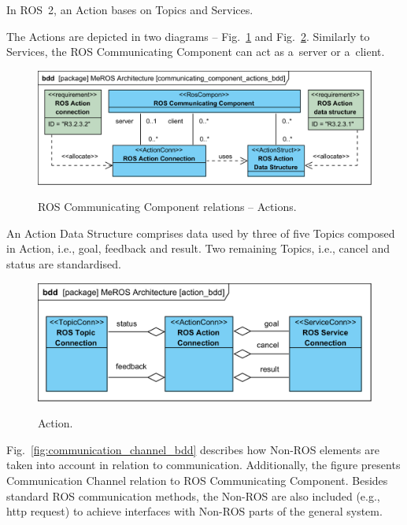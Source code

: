 \documentclass[11pt,oneside,a4paper]{report}
\begin{document}
	In ROS~2, an Action bases on Topics and Services.
	
	
	The Actions are depicted in two diagrams -- Fig.~\ref{fig:communicating_component_actions_bdd} and Fig.~\ref{fig:action_bdd}. Similarly to Services, the ROS Communicating Component can act as a~server or a~client.	 
	
	
	\begin{figure}[H]
		\centering
		\begin{center}
			{\includegraphics[scale=1.0]{diagrams/communicating_component_actions_bdd.png}}
		\end{center}
		\caption{ROS Communicating Component relations -- Actions.} 
		\label{fig:communicating_component_actions_bdd}
	\end{figure}
	
	An Action Data Structure comprises data used by three of five Topics composed in Action, i.e., goal, feedback and result. Two remaining Topics, i.e., cancel and status are standardised.
	
	\begin{figure}[hbt]
		\centering
		\begin{center}
			{\includegraphics[scale=1.0]{diagrams/action_bdd.png}}
		\end{center}
		\caption{Action.} 
		\label{fig:action_bdd}
	\end{figure}
	
	\pagebreak
	Fig.~\ref{fig:communication_channel_bdd} describes how Non-ROS elements are taken into account in relation to communication. Additionally, the figure presents Communication Channel relation to ROS Communicating Component. Besides standard ROS communication methods, the Non-ROS are also included (e.g., http request) to achieve interfaces with Non-ROS parts of the general system. 
	
\end{document}
